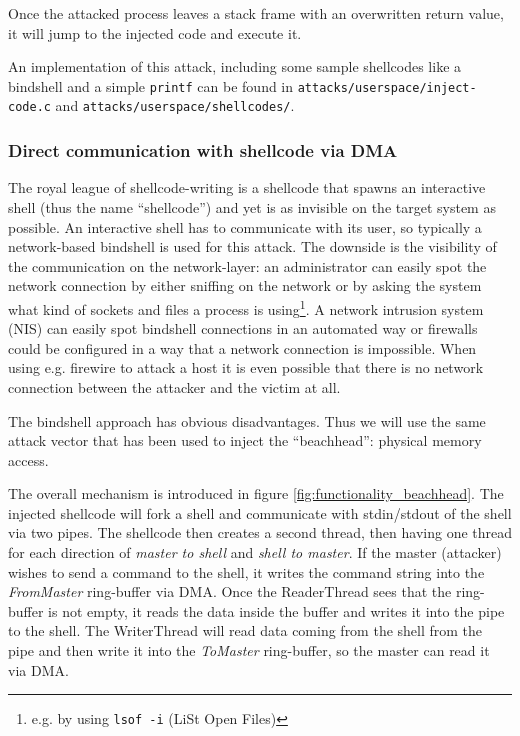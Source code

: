 Once the attacked process leaves a stack frame with an overwritten return value,
it will jump to the injected code and execute it.

An implementation of this attack, including some sample shellcodes like a
bindshell and a simple \texttt{printf} can be found in
\texttt{attacks/userspace/inject-code.c} and \linebreak
\texttt{attacks/userspace/shellcodes/}.


\subsubsection{Direct communication with shellcode via DMA}


\label{communication_DMA} The royal league of shellcode-writing is a shellcode
that spawns an interactive shell (thus the name ``shellcode'') and yet is as
invisible on the target system as possible. An interactive shell has to
communicate with its user, so typically a network-based bindshell is used for
this attack. The downside is the visibility of the communication on the
network-layer: an administrator can easily spot the network connection by either
sniffing on the network or by asking the system what kind of sockets and files a
process is using\footnote{e.g\@. by using \texttt{lsof -i} (LiSt Open Files)}. A
network intrusion system (NIS) can easily spot bindshell connections in an
automated way or firewalls could be configured in a way that a network
connection is impossible. When using e.g\@. firewire to attack a host it is even
possible that there is no network connection between the attacker and the victim
at all.

The bindshell approach has obvious disadvantages. Thus we will use the same
attack vector that has been used to inject the ``beachhead'': physical memory
access.

The overall mechanism is introduced in figure \ref{fig:functionality_beachhead}.
The injected shellcode will fork a shell and communicate with stdin/stdout of
the shell via two pipes. The shellcode then creates a second thread, then having
one thread for each direction of \emph{master to shell} and \emph{shell to
master}. If the master (attacker) wishes to send a command to the shell, it
writes the command string into the \emph{FromMaster} ring-buffer via DMA. Once
the ReaderThread sees that the ring-buffer is not empty, it reads the data
inside the buffer and writes it into the pipe to the shell. The WriterThread
will read data coming from the shell from the pipe and then write it into the
\emph{ToMaster} ring-buffer, so the master can read it via DMA.

